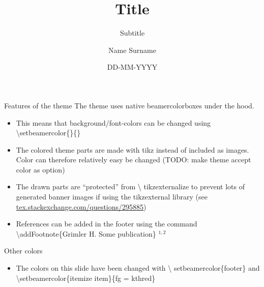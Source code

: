 \documentclass{beamer}
\date{DD-MM-YYYY}
\title{Title}
\subtitle{Subtitle}
\author{Name Surname}
\begin{document}
\begin{frame}[plain]
\maketitle
\end{frame}


\begin{frame}{Features of the theme}
  The theme uses native beamercolorboxes under the hood.
  \begin{itemize}
    \item This means that background/font-colors can be changed using \textbackslash setbeamercolor\{\}\{\}
    \item The colored theme parts are made with tikz instead of included as
        images. Color can therefore relatively easy be changed (TODO: make
        theme accept color as option)
    \item The drawn parts are ``protected'' from \textbackslash
      tikzexternalize to prevent lots of generated banner images if using the
      tikzexternal library (see
      \href{https://tex.stackexchange.com/questions/295885}
           {tex.stackexchange.com/questions/295885})
    \item References can be added in the footer using the command
      \textbackslash addFootnote\{Grimler H. Some publication\} $^{1,2}$
\end{itemize}
\vfill
\end{frame}

{
  \begin{frame}{Other colors}
    \begin{itemize}
      \item The colors on this slide have been changed with \textbackslash
        setbeamercolor\{footer\} and \textbackslash setbeamercolor\{itemize item\}\{fg = kthred\}
    \end{itemize}
  \end{frame}
}
\end{document}
